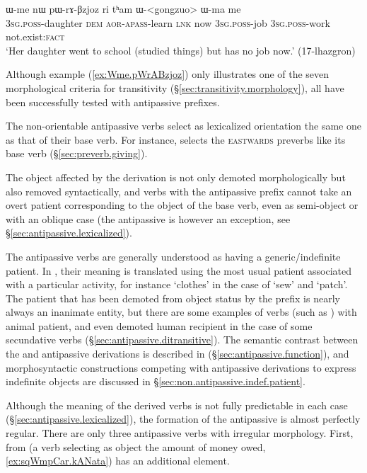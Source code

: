 \begin{exe}
\ex \label{ex:Wme.pWrABzjoz}
\gll ɯ-me nɯ pɯ-rɤ-βzjoz ri tʰam ɯ-<gongzuo> ɯ-ma me \\
\textsc{3sg}.\textsc{poss}-daughter \textsc{dem} \textsc{aor}-\textsc{apass}-learn \textsc{lnk} now \textsc{3sg}.\textsc{poss}-job \textsc{3sg}.\textsc{poss}-work not.exist:\textsc{fact} \\
\glt `Her daughter went to school (studied things) but has no job now.' (17-lhazgron)
\end{exe}

Although example (\ref{ex:Wme.pWrABzjoz}) only illustrates one of the seven morphological criteria for transitivity (§\ref{sec:transitivity.morphology}), all have been successfully tested with antipassive prefixes.

The non-orientable antipassive verbs select as lexicalized orientation the same one as that of their base verb. For instance,  selects the \textsc{eastwards} preverbs like its base verb  (§\ref{sec:preverb.giving}).
 
The object affected by the  derivation is not only demoted morphologically but also removed syntactically, and verbs with the antipassive prefix cannot take an overt patient corresponding to the object of the base verb, even as semi-object or with an oblique case (the antipassive  is however an exception, see §\ref{sec:antipassive.lexicalized}).

The antipassive verbs are generally understood as having a generic/indefinite patient. In , their meaning is translated using the most usual patient associated with a particular activity, for instance `clothes' in the case of  `sew' and  `patch'.  The patient that has been demoted from object status by the  prefix is nearly always an inanimate entity, but there are some examples of verbs (such as ) with animal patient, and even demoted human recipient in the case of some secundative verbs (§\ref{sec:antipassive.ditransitive}). The semantic contrast between the  and  antipassive derivations is described in (§\ref{sec:antipassive.function}), and morphosyntactic constructions competing with antipassive derivations to express indefinite objects are discussed in §\ref{sec:non.antipassive.indef.patient}.


Although the meaning of the derived verbs is not fully predictable in each case (§\ref{sec:antipassive.lexicalized}), the formation of the  antipassive is almost perfectly regular. There are only three  antipassive verbs with irregular morphology. First,   from   (a verb selecting as object the amount of money owed, \ref{ex:sqWmpCar.kANata}) has an additional  element. 

